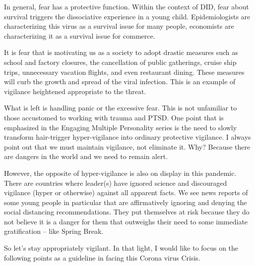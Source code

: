 \documentclass[]{book}
\begin{document}
In general, fear has a protective function. Within the context of DID, fear about survival triggers the dissociative experience in a young child. Epidemiologists are characterizing this virus as a survival issue for many people, economists are characterizing it as a survival issue for commerce.

It is fear that is motivating us as a society to adopt drastic measures such as school and factory closures, the cancellation of public gatherings, cruise ship trips, unnecessary vacation flights, and even restaurant dining. These measures will curb the growth and spread of the viral infection. This is an example of vigilance heightened appropriate to the threat.

What is left is handling panic or the excessive fear. This is not unfamiliar to those accustomed to working with trauma and PTSD. One point that is emphasized in the Engaging Multiple Personality series is the need to slowly transform hair-trigger hyper-vigilance into ordinary protective vigilance. I always point out that we must maintain vigilance, not eliminate it. Why? Because there are dangers in the world and we need to remain alert.

However, the opposite of hyper-vigilance is also on display in this pandemic. There are countries where leader(s) have ignored science and discouraged vigilance (hyper or otherwise) against all apparent facts. We see news reports of some young people in particular that are affirmatively ignoring and denying the social distancing recommendations. They put themselves at risk because they do not believe it is a danger for them that outweighs their need to some immediate gratification -- like Spring Break.

So let's stay appropriately vigilant. In that light, I would like to focus on the following points as a guideline in facing this Corona virus Crisis.
\end{document}
